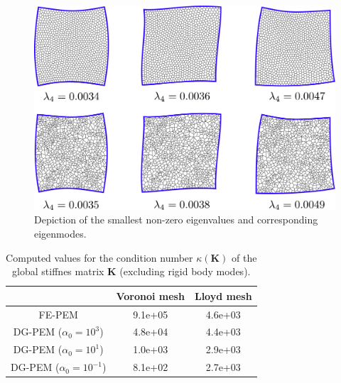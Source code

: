 \begin{figure}[!h]
  \centering
  \includegraphics[width=5.0in]{figures/patch_eigenmodes_DGPEM.pdf}  \caption{Depiction of the smallest non-zero eigenvalues and corresponding eigenmodes.}
  \label{fig:patch_eigenmodes_DGPEM}
\end{figure}

\begin{table}[!ht]
  \begin{center}
    \begin{tabular}{| c | c | c |}
    \hline
           & Voronoi mesh & Lloyd mesh \\ \hline
    FE-PEM & 9.1e+05 & 4.6e+03 \\ \hline
    DG-PEM ($\alpha_0 = 10^3$) & 4.8e+04 & 4.4e+03 \\ \hline
    DG-PEM ($\alpha_0 = 10^1$) & 1.0e+03 & 2.9e+03 \\ \hline
    DG-PEM ($\alpha_0 = 10^{-1}$) & 8.1e+02 & 2.7e+03 \\
    \hline
    \end{tabular}
    \caption{Computed values for the condition number $\kappa(\mathbf{K})$ of the global stiffnes matrix $\mathbf{K}$ (excluding rigid body modes).}
    \vspace{-5pt}
    \label{tab:global_stiffness_condition_number}
    \vspace{-25pt}
  \end{center}
\end{table}



